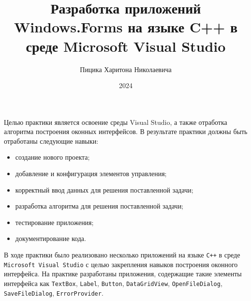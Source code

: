 \documentclass[bachelor, och, pract]{SCWorks}
\begin{document}
\title{Разработка приложений Windows.Forms на языке C++ в
среде Microsoft Visual Studio}

\author{Пицика Харитона Николаевича}





\date{2024}
\maketitle

\tableofcontents

\intro
Целью практики является освоение среды Visual Studio, а также отработка алгоритма 
построения оконных интерфейсов. В результате практики должны быть отработаны следующие навыки:
\begin{itemize}
    \item создание нового проекта;
    \item добавление и конфигурация элементов управления;
    \item корректный ввод данных для решения поставленной задачи;
    \item разработка алгоритма для решения поставленной задачи;
    \item тестирование приложения;
    \item документирование кода.
\end{itemize}







\conclusion
В ходе практики было реализовано несколько приложений на языке \verb|C++|
в среде \verb|Microsoft Visual Studio| с целью закрепления навыков построения оконного интерфейса. 
На практике разработаны приложения, содержащие такие
элементы интерфейса как \verb|TextBox|, \verb|Label|, \verb|Button|, 
\verb|DataGridView|,
\verb|OpenFileDialog|, \verb|SaveFileDialog|, \verb|ErrorProvider|.
\newpage




\appendix


\end{document}
